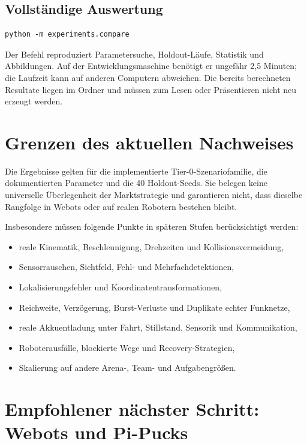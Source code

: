 \documentclass[11pt,a4paper]{article}
\newcommand{\codepath}[1]{\texttt{\detokenize{#1}}}
\begin{document}
\subsection{Vollständige Auswertung}

\begin{verbatim}
python -m experiments.compare
\end{verbatim}

Der Befehl reproduziert Parametersuche, Holdout-Läufe, Statistik und Abbildungen. Auf der
Entwicklungsmaschine benötigt er ungefähr 2,5 Minuten; die Laufzeit kann auf anderen
Computern abweichen. Die bereits berechneten Resultate liegen im Ordner
\codepath{results/} und müssen zum Lesen oder Präsentieren nicht neu erzeugt werden.

\section{Grenzen des aktuellen Nachweises}

Die Ergebnisse gelten für die implementierte Tier-0-Szenariofamilie, die dokumentierten
Parameter und die 40 Holdout-Seeds. Sie belegen keine universelle Überlegenheit der
Marktstrategie und garantieren nicht, dass dieselbe Rangfolge in Webots oder auf realen
Robotern bestehen bleibt.

Insbesondere müssen folgende Punkte in späteren Stufen berücksichtigt werden:

\begin{itemize}
  \item reale Kinematik, Beschleunigung, Drehzeiten und Kollisionsvermeidung,
  \item Sensorrauschen, Sichtfeld, Fehl- und Mehrfachdetektionen,
  \item Lokalisierungsfehler und Koordinatentransformationen,
  \item Reichweite, Verzögerung, Burst-Verluste und Duplikate echter Funknetze,
  \item reale Akkuentladung unter Fahrt, Stillstand, Sensorik und Kommunikation,
  \item Roboterausfälle, blockierte Wege und Recovery-Strategien,
  \item Skalierung auf andere Arena-, Team- und Aufgabengrößen.
\end{itemize}

\section{Empfohlener nächster Schritt: Webots und Pi-Pucks}
\end{document}
